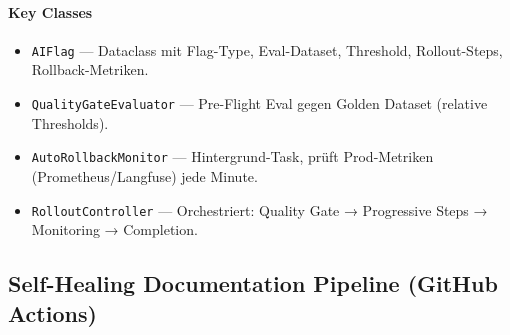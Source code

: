 \paragraph{Key Classes}
\begin{itemize}
    \item \texttt{AIFlag} — Dataclass mit Flag-Type, Eval-Dataset, Threshold, Rollout-Steps, Rollback-Metriken.
    \item \texttt{QualityGateEvaluator} — Pre-Flight Eval gegen Golden Dataset (relative Thresholds).
    \item \texttt{AutoRollbackMonitor} — Hintergrund-Task, prüft Prod-Metriken (Prometheus/Langfuse) jede Minute.
    \item \texttt{RolloutController} — Orchestriert: Quality Gate → Progressive Steps → Monitoring → Completion.
\end{itemize}


\subsection{Self-Healing Documentation Pipeline (GitHub Actions)}

